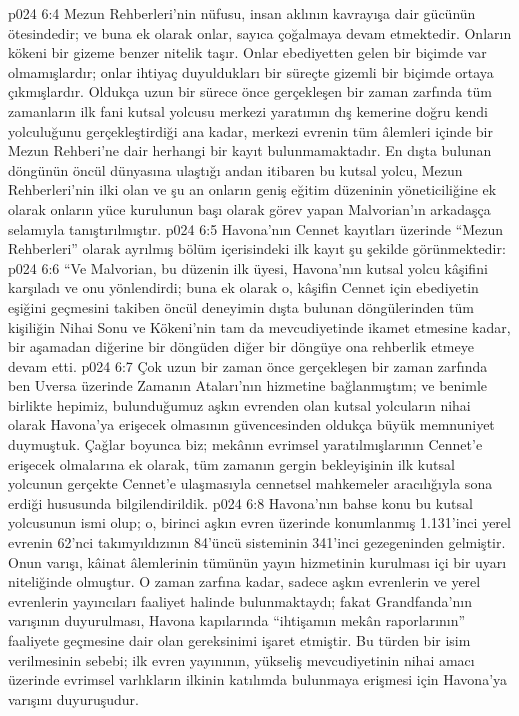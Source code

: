 \vs p024 6:4 Mezun Rehberleri’nin nüfusu, insan aklının kavrayışa dair gücünün ötesindedir; ve buna ek olarak onlar, sayıca çoğalmaya devam etmektedir. Onların kökeni bir gizeme benzer nitelik taşır. Onlar ebediyetten gelen bir biçimde var olmamışlardır; onlar ihtiyaç duyuldukları bir süreçte gizemli bir biçimde ortaya çıkmışlardır. Oldukça uzun bir sürece önce gerçekleşen bir zaman zarfında tüm zamanların ilk fani kutsal yolcusu merkezi yaratımın dış kemerine doğru kendi yolculuğunu gerçekleştirdiği ana kadar, merkezi evrenin tüm âlemleri içinde bir Mezun Rehberi’ne dair herhangi bir kayıt bulunmamaktadır. En dışta bulunan döngünün öncül dünyasına ulaştığı andan itibaren bu kutsal yolcu, Mezun Rehberleri’nin ilki olan ve şu an onların geniş eğitim düzeninin yöneticiliğine ek olarak onların yüce kurulunun başı olarak görev yapan Malvorian’ın arkadaşça selamıyla tanıştırılmıştır.
\vs p024 6:5 Havona’nın Cennet kayıtları üzerinde “Mezun Rehberleri” olarak ayrılmış bölüm içerisindeki ilk kayıt şu şekilde görünmektedir:
\vs p024 6:6 “Ve Malvorian, bu düzenin ilk üyesi, Havona’nın kutsal yolcu kâşifini karşıladı ve onu yönlendirdi; buna ek olarak o, kâşifin Cennet için ebediyetin eşiğini geçmesini takiben öncül deneyimin dışta bulunan döngülerinden tüm kişiliğin Nihai Sonu ve Kökeni’nin tam da mevcudiyetinde ikamet etmesine kadar, bir aşamadan diğerine bir döngüden diğer bir döngüye ona rehberlik etmeye devam etti.
\vs p024 6:7 Çok uzun bir zaman önce gerçekleşen bir zaman zarfında ben Uversa üzerinde Zamanın Ataları’nın hizmetine bağlanmıştım; ve benimle birlikte hepimiz, bulunduğumuz aşkın evrenden olan kutsal yolcuların nihai olarak Havona’ya erişecek olmasının güvencesinden oldukça büyük memnuniyet duymuştuk. Çağlar boyunca biz; mekânın evrimsel yaratılmışlarının Cennet’e erişecek olmalarına ek olarak, tüm zamanın gergin bekleyişinin ilk kutsal yolcunun gerçekte Cennet’e ulaşmasıyla cennetsel mahkemeler aracılığıyla sona erdiği hususunda bilgilendirildik.
\vs p024 6:8 Havona’nın bahse konu bu kutsal yolcusunun ismi  olup; o, birinci aşkın evren üzerinde konumlanmış 1.131’inci yerel evrenin 62’nci takımyıldızının 84’üncü sisteminin 341’inci gezegeninden gelmiştir. Onun varışı, kâinat âlemlerinin tümünün yayın hizmetinin kurulması içi bir uyarı niteliğinde olmuştur. O zaman zarfına kadar, sadece aşkın evrenlerin ve yerel evrenlerin yayıncıları faaliyet halinde bulunmaktaydı; fakat Grandfanda’nın varışının duyurulması, Havona kapılarında “ihtişamın mekân raporlarının” faaliyete geçmesine dair olan gereksinimi işaret etmiştir. Bu türden bir isim verilmesinin sebebi; ilk evren yayınının, yükseliş mevcudiyetinin nihai amacı üzerinde evrimsel varlıkların ilkinin katılımda bulunmaya erişmesi için Havona’ya varışını duyuruşudur.
